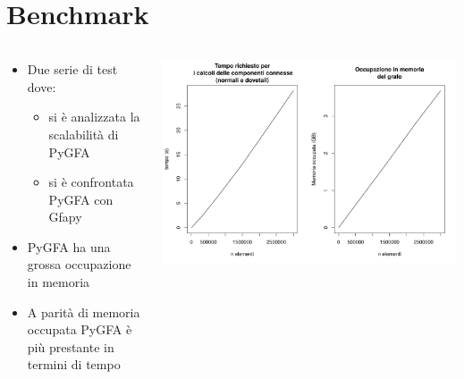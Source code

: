 \documentclass{beamer}
\begin{document}
\section{Benchmark}
\begin{frame}{\secname}
	\begin{columns}
		\begin{column}{0.5\textwidth}
		
			\begin{itemize}
				\item Due serie di test dove:
					\begin{itemize}
						\item si è analizzata la scalabilità di PyGFA
						\item si è confrontata PyGFA con Gfapy
					\end{itemize}
				\item PyGFA ha una grossa occupazione in memoria
				\item A parità di memoria occupata PyGFA è più prestante in termini di tempo
			\end{itemize}
		
		\end{column}
		\begin{column}{0.5\textwidth}
			\centering
			\includegraphics[height=0.45\textheight, width=\textwidth, keepaspectratio]{bench_singular}
			

\end{column}
\end{columns}
\end{frame}
\end{document}
